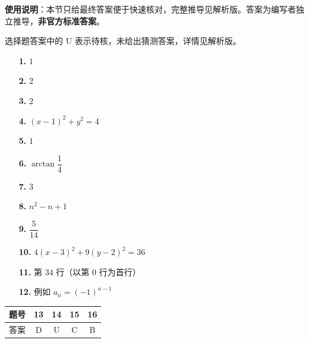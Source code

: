 
\begin{gknotice}
\textbf{使用说明}：本节只给最终答案便于快速核对，完整推导见解析版。答案为编写者独立推导，\textbf{非官方标准答案}。
\end{gknotice}

\begin{gknotice}
选择题答案中的 U 表示待核，未给出猜测答案，详情见解析版。
\end{gknotice}

\begin{itemize}[leftmargin=2.6em]
  \item[\textbf{1.}] $1$
  \item[\textbf{2.}] $2$
  \item[\textbf{3.}] $2$
  \item[\textbf{4.}] $(x-1)^2+y^2=4$
  \item[\textbf{5.}] $1$
  \item[\textbf{6.}] $\arctan\dfrac14$
  \item[\textbf{7.}] $3$
  \item[\textbf{8.}] $n^2-n+1$
  \item[\textbf{9.}] $\dfrac5{14}$
  \item[\textbf{10.}] $4(x-3)^2+9(y-2)^2=36$
  \item[\textbf{11.}] 第 $34$ 行（以第 0 行为首行）
  \item[\textbf{12.}] 例如 $a_n=(-1)^{n-1}$
\end{itemize}

\begin{center}\begin{tabular}{ccccc}
\toprule
题号 & 13 & 14 & 15 & 16 \\
\midrule
答案 & D & U & C & B \\
\bottomrule
\end{tabular}\end{center}


